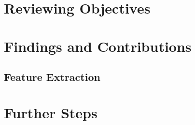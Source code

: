 \section{Reviewing Objectives}
	
\section{Findings and Contributions}
\subsection{Feature Extraction}
	
\section{Further Steps}